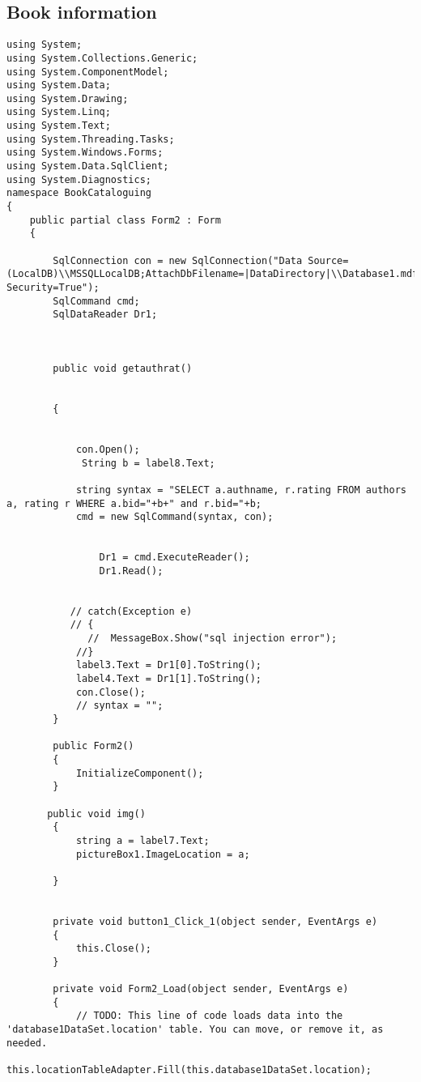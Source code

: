 \subsection{Book information}
\begin{lstlisting}
using System;
using System.Collections.Generic;
using System.ComponentModel;
using System.Data;
using System.Drawing;
using System.Linq;
using System.Text;
using System.Threading.Tasks;
using System.Windows.Forms;
using System.Data.SqlClient;
using System.Diagnostics;
namespace BookCataloguing
{
    public partial class Form2 : Form
    {

        SqlConnection con = new SqlConnection("Data Source=(LocalDB)\\MSSQLLocalDB;AttachDbFilename=|DataDirectory|\\Database1.mdf;Integrated Security=True");
        SqlCommand cmd;
        SqlDataReader Dr1;

        

        public void getauthrat()


        {
           
            
            con.Open();
             String b = label8.Text;

            string syntax = "SELECT a.authname, r.rating FROM authors a, rating r WHERE a.bid="+b+" and r.bid="+b;
            cmd = new SqlCommand(syntax, con);
            
            
                Dr1 = cmd.ExecuteReader();
                Dr1.Read();
                
            
           // catch(Exception e)
           // {
              //  MessageBox.Show("sql injection error");
            //}
            label3.Text = Dr1[0].ToString();
            label4.Text = Dr1[1].ToString();
            con.Close();
            // syntax = "";
        }

        public Form2()
        {
            InitializeComponent();
        }

       public void img()
        {
            string a = label7.Text;
            pictureBox1.ImageLocation = a;
            
        }
       
        
        private void button1_Click_1(object sender, EventArgs e)
        {
            this.Close();
        }

        private void Form2_Load(object sender, EventArgs e)
        {
            // TODO: This line of code loads data into the 'database1DataSet.location' table. You can move, or remove it, as needed.
            this.locationTableAdapter.Fill(this.database1DataSet.location);


\end{lstlisting}
